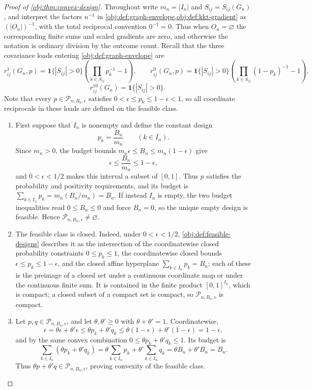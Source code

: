\begin{proof}[Proof of \cref{obj:thm:convex-design}]
Throughout write \(m_n=|I_n|\) and \(S_{ij}=S_{ij}(G_n)\), and interpret the factors \(n^{-1}\) in \cref{obj:def:graph-envelope,obj:def:kkt-gradient} as \((|O_n|)^{-1}\), with the total reciprocal convention \(0^{-1}=0\).  Thus when \(O_n=\varnothing\) the corresponding finite sums and scaled gradients are zero, and otherwise the notation is ordinary division by the outcome count.  Recall that the three covariance loads entering \cref{obj:def:graph-envelope} are
\[
r_{ij}^1(G_n,p)
=\mathbf 1\{|S_{ij}|>0\}\left(\prod_{k\in S_{ij}}p_k^{-1}-1\right),
\qquad
r_{ij}^0(G_n,p)
=\mathbf 1\{|S_{ij}|>0\}\left(\prod_{k\in S_{ij}}(1-p_k)^{-1}-1\right),
\]
\[
r_{ij}^{10}(G_n)=\mathbf 1\{|S_{ij}|>0\}.
\]
Note that every \(p\in\mathcal P_{n,B_n,\epsilon}\) satisfies \(0<\epsilon\le p_k\le1-\epsilon<1\), so all coordinate reciprocals in these loads are defined on the feasible class.

\begin{enumerate}
\item First suppose that \(I_n\) is nonempty and define the constant design
\[
p_k=\frac{B_n}{m_n}\qquad(k\in I_n).
\]
Since \(m_n>0\), the budget bounds \(m_n\epsilon\le B_n\le m_n(1-\epsilon)\) give
\[
\epsilon\le \frac{B_n}{m_n}\le 1-\epsilon,
\]
and \(0<\epsilon<1/2\) makes this interval a subset of \([0,1]\).  Thus \(p\) satisfies the probability and positivity requirements, and its budget is \(\sum_{k\in I_n}p_k=m_n(B_n/m_n)=B_n\).  If instead \(I_n\) is empty, the two budget inequalities read \(0\le B_n\le0\) and force \(B_n=0\), so the unique empty design is feasible.  Hence \(\mathcal P_{n,B_n,\epsilon}\neq\varnothing\).

\item The feasible class is closed.  Indeed, under \(0<\epsilon<1/2\), \cref{obj:def:feasible-designs} describes it as the intersection of the coordinatewise closed probability constraints \(0\le p_k\le1\), the coordinatewise closed bounds \(\epsilon\le p_k\le1-\epsilon\), and the closed affine hyperplane \(\sum_{k\in I_n}p_k=B_n\); each of these is the preimage of a closed set under a continuous coordinate map or under the continuous finite sum.  It is contained in the finite product \([0,1]^{I_n}\), which is compact; a closed subset of a compact set is compact, so \(\mathcal P_{n,B_n,\epsilon}\) is compact.

\item Let \(p,q\in\mathcal P_{n,B_n,\epsilon}\), and let \(\theta,\theta'\ge0\) with \(\theta+\theta'=1\).  Coordinatewise,
\[
\epsilon=\theta\epsilon+\theta'\epsilon
 \le \theta p_k+\theta'q_k
 \le \theta(1-\epsilon)+\theta'(1-\epsilon)=1-\epsilon,
\]
and by the same convex combination \(0\le \theta p_k+\theta'q_k\le1\).  Its budget is
\[
\sum_{k\in I_n}(\theta p_k+\theta'q_k)
 =\theta\sum_{k\in I_n}p_k+\theta'\sum_{k\in I_n}q_k
 =\theta B_n+\theta'B_n=B_n.
\]
Thus \(\theta p+\theta'q\in\mathcal P_{n,B_n,\epsilon}\), proving convexity of the feasible class.


\end{enumerate}
\end{proof}
